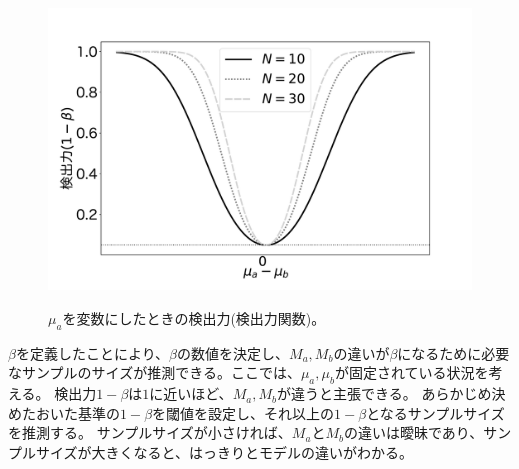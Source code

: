 \begin{figure}
    \begin{center}
        \includegraphics[width=15cm]{./image/04_/power_of_test.pdf}
        \label{fig:power_of_test_N_mu0_variable}
        \caption{$\mu_a$を変数にしたときの検出力(検出力関数)。}
    \end{center}
\end{figure}

$\beta$を定義したことにより、$\beta$の数値を決定し、$M_a,M_b$の違いが$\beta$になるために必要なサンプルのサイズが推測できる。ここでは、$\mu_a,\mu_b$が固定されている状況を考える。
検出力$1-\beta$は$1$に近いほど、$M_a,M_b$が違うと主張できる。
あらかじめ決めたおいた基準の$1-\beta$を閾値を設定し、それ以上の$1-\beta$となるサンプルサイズを推測する。
サンプルサイズが小さければ、$M_a$と$M_b$の違いは曖昧であり、サンプルサイズが大きくなると、はっきりとモデルの違いがわかる。




